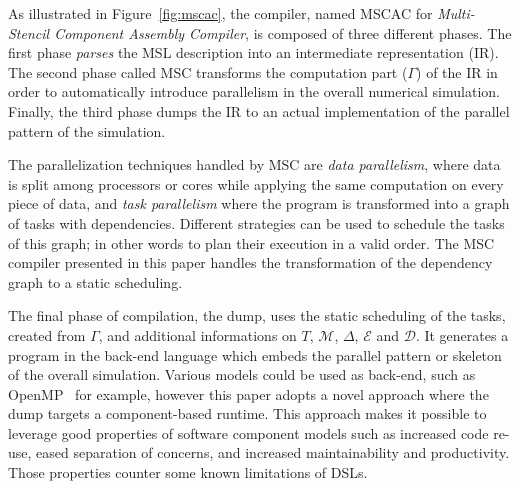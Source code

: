 As illustrated in Figure~\ref{fig:mscac}, the compiler, named MSCAC for \emph{Multi-Stencil Component Assembly Compiler}, is composed of three different phases. The first phase \emph{parses} the MSL description into an intermediate representation (IR). The second phase called MSC transforms the computation part ($\Gamma$) of the IR in order to automatically introduce parallelism in the overall numerical simulation.
Finally, the third phase dumps the IR to an actual implementation of the parallel pattern of the simulation.


The parallelization techniques handled by MSC are \emph{data parallelism}, where data is split among processors or cores while applying the same computation on every piece of data, and \emph{task parallelism} where the program is transformed into a graph of tasks with dependencies.
Different strategies can be used to schedule the tasks of this graph; in other words to plan their execution in a valid order. The MSC compiler presented in this paper handles the transformation of the dependency graph to a static scheduling.

The final phase of compilation, the dump, uses the static scheduling of the tasks, created from $\Gamma$, and additional informations on $T$, $\mathcal{M}$, $\Delta$, $\mathcal{E}$ and $\mathcal{D}$.
It generates a program in the back-end language which embeds the parallel pattern or skeleton of the overall simulation.
Various models could be used as back-end, such as OpenMP~\cite{660313} for example, however this paper adopts a novel approach where the dump targets a component-based runtime.
This approach makes it possible to leverage good properties of software component models such as increased code re-use, eased separation of concerns, and increased maintainability and productivity.
Those properties counter some known limitations of DSLs. %

